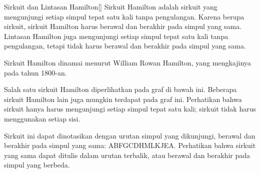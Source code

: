 \begin{definition}{Sirkuit dan Lintasan Hamilton}[]
Sirkuit Hamilton adalah sirkuit yang mengunjungi setiap simpul tepat satu kali tanpa pengulangan.  Karena berupa sirkuit, sirkuit Hamilton harus berawal dan berakhir pada simpul yang sama.  Lintasan Hamilton juga mengunjungi setiap simpul tepat satu kali tanpa pengulangan, tetapi tidak harus berawal dan berakhir pada simpul yang sama.  
\end{definition}

Sirkuit Hamilton dinamai menurut William Rowan Hamilton, yang mengkajinya pada tahun 1800-an.

\begin{example}{} %
Salah satu sirkuit Hamilton diperlihatkan pada graf di bawah ini.  Beberapa sirkuit Hamilton lain juga mungkin terdapat pada graf ini.  Perhatikan bahwa sirkuit hanya harus mengunjungi setiap simpul tepat satu kali; sirkuit tidak harus menggunakan setiap sisi.  

Sirkuit ini dapat dinotasikan dengan urutan simpul yang dikunjungi, berawal dan berakhir pada simpul yang sama: ABFGCDHMLKJEA.  Perhatikan bahwa sirkuit yang sama dapat ditulis dalam urutan terbalik, atau berawal dan berakhir pada simpul yang berbeda.
\begin{center}
\end{center}
\end{example}

